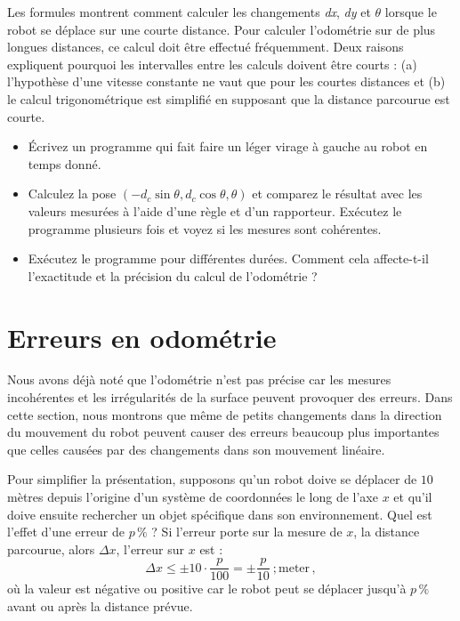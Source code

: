 Les formules montrent comment calculer les changements \textit{dx}, \textit{dy} et $\theta$ lorsque le robot se déplace sur une courte distance. Pour calculer l'odométrie sur de plus longues distances, ce calcul doit être effectué fréquemment. Deux raisons expliquent pourquoi les intervalles entre les calculs doivent être courts : (a) l'hypothèse d'une vitesse constante ne vaut que pour les courtes distances et (b) le calcul trigonométrique est simplifié en supposant que la distance parcourue est courte.

\begin{framed}
\begin{itemize}
\item Écrivez un programme qui fait faire un léger virage à gauche au robot en temps donné.
\item Calculez la pose $( - d_c \sin \theta, d_c \cos \theta, \theta)$ et comparez le résultat avec les valeurs mesurées à l'aide d'une règle et d'un rapporteur. Exécutez le programme plusieurs fois et voyez si les mesures sont cohérentes.
\item Exécutez le programme pour différentes durées. Comment cela affecte-t-il l'exactitude et la précision du calcul de l'odométrie ?
\end{itemize}
\end{framed}

\section{Erreurs en odométrie}\label{s.odometry-errors}

Nous avons déjà noté que l'odométrie n'est pas précise car les mesures incohérentes et les irrégularités de la surface peuvent provoquer des erreurs. Dans cette section, nous montrons que même de petits changements dans la direction du mouvement du robot peuvent causer des erreurs beaucoup plus importantes que celles causées par des changements dans son mouvement linéaire.

Pour simplifier la présentation, supposons qu'un robot doive se déplacer de $10$ mètres depuis l'origine d'un système de coordonnées le long de l'axe $x$ et qu'il doive ensuite rechercher un objet spécifique dans son environnement. Quel est l'effet d'une erreur de $p\,\%$ ? Si l'erreur porte sur la mesure de $x$, la distance parcourue, alors $\Delta x$, l'erreur sur $x$ est :
\[\Delta x \leq \pm 10\cdot\frac{p}{100} = \pm\frac{p}{10}\ ; \textrm{meter}\,,\]
où la valeur est négative ou positive car le robot peut se déplacer jusqu'à $p\,\%$ avant ou après la distance prévue.

